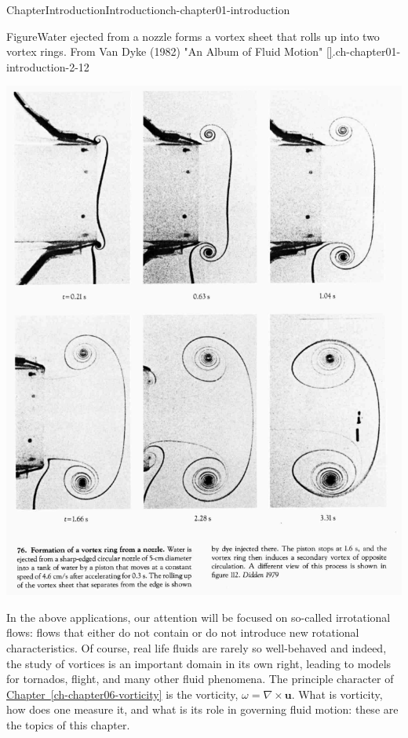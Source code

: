 \documentclass[oneside,10pt,]{book}
\newcommand{\xreffont}{\relax}
\numberwithin{equation}{section}
\newcommand{\bu}{\boldsymbol{u}}
\begin{document}
\begin{chapterptx}{Chapter}{Introduction}{}{Introduction}{}{}{ch-chapter01-introduction}
\begin{introduction}{}
\begin{figureptx}{Figure}{Water ejected from a nozzle forms a vortex sheet that rolls up into two vortex rings. From Van Dyke (1982) "An Album of Fluid Motion" \hyperlink{ref-album}{[{\xreffont 3}]}.}{ch-chapter01-introduction-2-12}{}%
\begin{image}{0.15}{0.7}{0.15}{}%
\includegraphics[width=\linewidth]{external/vortexring.png}
\end{image}%
\tcblower
\end{figureptx}%
In the above applications, our attention will be focused on so-called irrotational flows: flows that either do not contain or do not introduce new rotational characteristics. Of course, real life fluids are rarely so well-behaved and indeed, the study of vortices is an important domain in its own right, leading to models for tornados, flight, and many other fluid phenomena. The principle character of \hyperref[ch-chapter06-vorticity]{Chapter~{\xreffont\ref{ch-chapter06-vorticity}}} is the vorticity, \(\omega = \nabla \times \bu\). What is vorticity, how does one measure it, and what is its role in governing fluid motion: these are the topics of this chapter.%

\end{introduction}
\end{chapterptx}
\end{document}
